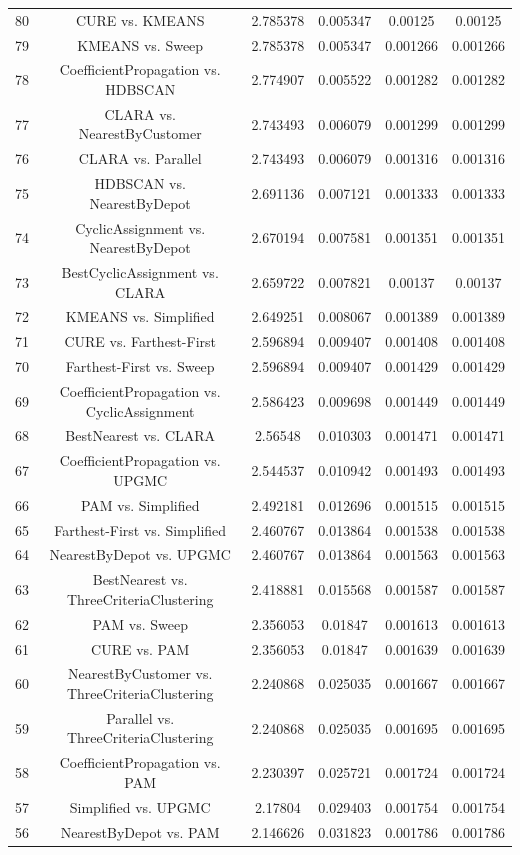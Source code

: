 \documentclass[a4paper,10pt]{article}
\begin{document}
\begin{landscape}
\begin{table}[!htp]
\begin{tabular}{cccccc}
80&CURE vs. KMEANS&2.785378&0.005347&0.00125&0.00125\\
79&KMEANS vs. Sweep&2.785378&0.005347&0.001266&0.001266\\
78&CoefficientPropagation vs. HDBSCAN&2.774907&0.005522&0.001282&0.001282\\
77&CLARA vs. NearestByCustomer&2.743493&0.006079&0.001299&0.001299\\
76&CLARA vs. Parallel&2.743493&0.006079&0.001316&0.001316\\
75&HDBSCAN vs. NearestByDepot&2.691136&0.007121&0.001333&0.001333\\
74&CyclicAssignment vs. NearestByDepot&2.670194&0.007581&0.001351&0.001351\\
73&BestCyclicAssignment vs. CLARA&2.659722&0.007821&0.00137&0.00137\\
72&KMEANS vs. Simplified&2.649251&0.008067&0.001389&0.001389\\
71&CURE vs. Farthest-First&2.596894&0.009407&0.001408&0.001408\\
70&Farthest-First vs. Sweep&2.596894&0.009407&0.001429&0.001429\\
69&CoefficientPropagation vs. CyclicAssignment&2.586423&0.009698&0.001449&0.001449\\
68&BestNearest vs. CLARA&2.56548&0.010303&0.001471&0.001471\\
67&CoefficientPropagation vs. UPGMC&2.544537&0.010942&0.001493&0.001493\\
66&PAM vs. Simplified&2.492181&0.012696&0.001515&0.001515\\
65&Farthest-First vs. Simplified&2.460767&0.013864&0.001538&0.001538\\
64&NearestByDepot vs. UPGMC&2.460767&0.013864&0.001563&0.001563\\
63&BestNearest vs. ThreeCriteriaClustering&2.418881&0.015568&0.001587&0.001587\\
62&PAM vs. Sweep&2.356053&0.01847&0.001613&0.001613\\
61&CURE vs. PAM&2.356053&0.01847&0.001639&0.001639\\
60&NearestByCustomer vs. ThreeCriteriaClustering&2.240868&0.025035&0.001667&0.001667\\
59&Parallel vs. ThreeCriteriaClustering&2.240868&0.025035&0.001695&0.001695\\
58&CoefficientPropagation vs. PAM&2.230397&0.025721&0.001724&0.001724\\
57&Simplified vs. UPGMC&2.17804&0.029403&0.001754&0.001754\\
56&NearestByDepot vs. PAM&2.146626&0.031823&0.001786&0.001786\\

\end{tabular}
\end{table}
\end{landscape}
\end{document}
